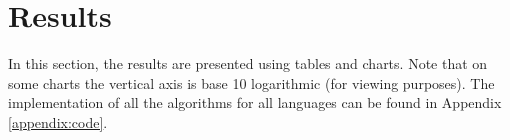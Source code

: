 \section{Results}
In this section, the results are presented using tables and charts. Note that on some charts the vertical axis is base 10 logarithmic (for viewing purposes). The implementation of all the algorithms for all languages can be found in Appendix \ref{appendix:code}.










